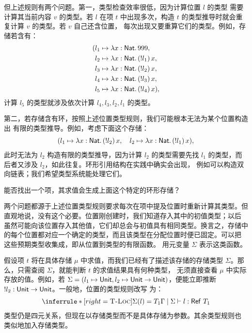 但上述规则有两个问题。第一，类型检查效率很低，因为计算位置 \(l\) 的类型
需要计算其当前内容 \(v\) 的类型。若 \(l\) 在项 \(t\) 中出现多次，构造
\(t\) 的类型推导时就会重复计算 \(v\) 的类型。若 \(v\) 自己还含位置，
每次出现又要重算它们的类型。例如，存储若含有：
\[
\begin{aligned}
(&l_1\mapsto\lambda x:\mathsf{Nat}.\,999,\\
 &l_2\mapsto\lambda x:\mathsf{Nat}.\,(!l_1)\,x,\\
 &l_3\mapsto\lambda x:\mathsf{Nat}.\,(!l_2)\,x,\\
 &l_4\mapsto\lambda x:\mathsf{Nat}.\,(!l_3)\,x,\\
 &l_5\mapsto\lambda x:\mathsf{Nat}.\,(!l_4)\,x),
\end{aligned}
\]
计算 \(l_5\) 的类型就涉及依次计算 \(l_4,l_3,l_2,l_1\) 的类型。

第二，若存储含有环，按照上述位置类型规则，我们可能根本无法为某个位置构造出
有限的类型推导。例如，考虑下面这个存储：
\[
(l_1\mapsto\lambda x:\mathsf{Nat}.\,(!l_2)\,x,\quad
 l_2\mapsto\lambda x:\mathsf{Nat}.\,(!l_1)\,x),
\]
此时无法为 \(l_2\) 构造有限的类型推导，因为计算 \(l_2\) 的类型需要先找
\(l_1\) 的类型，而后者又涉及 \(l_2\)，如此往复。环形引用结构在实践中确实会出现，
例如可以构造双向链表；我们希望类型系统能处理它们。

\begin{exercise}[\(\star\)]
\label{ex:13.4.1}
能否找出一个项，其求值会生成上面这个特定的环形存储？
\end{exercise}

两个问题都源于上述位置类型规则要求每次在项中提及位置时重新计算其类型。但
直观地说，没有这个必要。位置刚创建时，我们知道存入其中的初值类型；以后
虽然可能向该位置存入其他值，它们却总会与初值具有相同类型。换言之，存储中
的每个位置都对应一个确定的类型，而且该类型在分配位置时便已固定。可以把
这些预期类型收集成，即从位置到类型的有限函数。
用元变量 \(\Sigma\) 表示这类函数。

假设项 \(t\) 将在具体存储 \(\mu\) 中求值，而我们已经有了描述该存储的存储类型
\(\Sigma\)。那么，只需查阅 \(\Sigma\)，就能判断 \(t\) 的求值结果具有何种类型，
无须直接查看 \(\mu\) 中实际存放的值。例如，若
\(\Sigma=(l_1\mapsto\mathsf{Unit},
l_2\mapsto\mathsf{Unit}\to\mathsf{Unit})\)，便能立即推断
\(!l_2:\mathsf{Unit}\to\mathsf{Unit}\)。一般地，位置的类型规则改写
为：
\[
\inferrule*[right=\textsc{T-Loc}]
 {\Sigma(l)=T_1}
 {\Gamma\mid\Sigma\vdash l:\tapltype{Ref}\ T_1}
\]
类型仍是四元关系，但现在以存储类型而不是具体存储为参数。其余类型规则也
类似地加入存储类型。

